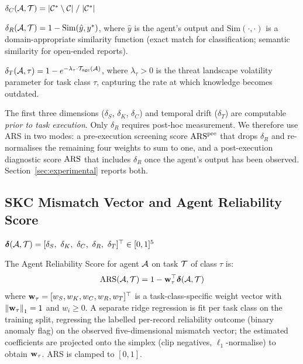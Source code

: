\begin{definition}
  $\delta_C(\mathcal{A}, \mathcal{T}) = |\mathcal{C}^* \setminus \mathcal{C}| \;/\; |\mathcal{C}^*|$
\end{definition}

\begin{definition}
  $\delta_R(\mathcal{A}, \mathcal{T}) = 1 - \mathrm{Sim}(\hat{y}, y^*)$,
  where $\hat{y}$ is the agent's output and $\mathrm{Sim}(\cdot,\cdot)$ is
  a domain-appropriate similarity function (exact match for classification;
  semantic similarity for open-ended reports).
\end{definition}

\begin{definition}
  $\delta_T(\mathcal{A}, \tau) = 1 - e^{-\lambda_\tau \cdot \mathcal{T}_{\mathrm{age}}(\mathcal{A})}$,
  where $\lambda_\tau > 0$ is the threat landscape volatility parameter for
  task class $\tau$, capturing the rate at which knowledge becomes outdated.
\end{definition}

The first three dimensions ($\delta_S$, $\delta_K$, $\delta_C$) and temporal
drift ($\delta_T$) are computable \textit{prior to task execution}. Only
$\delta_R$ requires post-hoc measurement. We therefore use ARS in two
modes: a pre-execution screening score $\mathrm{ARS}^{\mathrm{pre}}$ that drops
$\delta_R$ and re-normalises the remaining four weights to sum to one,
and a post-execution diagnostic score $\mathrm{ARS}$ that includes $\delta_R$
once the agent's output has been observed. Section~\ref{sec:experimental}
reports both.

\subsection{SKC Mismatch Vector and Agent Reliability Score}

\begin{definition}
  $\bdelta(\A, \T) = [\delta_S,\ \delta_K,\ \delta_C,\ \delta_R,\ \delta_T]^\top \in [0,1]^5$
\end{definition}

\begin{definition}
\label{def:ars}
  The Agent Reliability Score for agent $\mathcal{A}$ on task $\mathcal{T}$ of class $\tau$ is:
  \begin{equation}
    \mathrm{ARS}(\mathcal{A}, \mathcal{T}) = 1 - \mathbf{w}_\tau^\top \boldsymbol{\delta}(\mathcal{A}, \mathcal{T})
    \label{eq:ars}
  \end{equation}
  where $\mathbf{w}_\tau = [w_S, w_K, w_C, w_R, w_T]^\top$ is a task-class-specific
  weight vector with $\left\lVert\mathbf{w}_\tau\right\rVert_1 = 1$ and $w_i \geq 0$. A separate
  ridge regression is fit per task class on the training split, regressing
  the labelled per-record reliability outcome (binary anomaly flag) on the
  observed five-dimensional mismatch vector; the estimated coefficients are
  projected onto the simplex (clip negatives, $\ell_1$-normalise) to obtain
  $\mathbf{w}_\tau$. ARS is clamped to $[0,1]$.
\end{definition}


